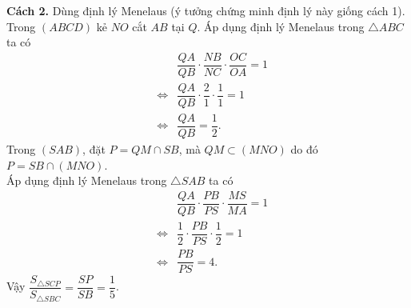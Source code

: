 \begin{bt}
{\begin{enumerate}
	\textbf{Cách 2.} Dùng định lý Menelaus (ý tưởng chứng minh định lý này giống cách 1).\\
	Trong $ (ABCD) $ kẻ $ NO $ cắt $ AB $	tại $ Q $. Áp dụng định lý Menelaus trong $ \triangle ABC $ ta có
	\begin{eqnarray*}
		& & \dfrac{QA}{QB} \cdot \dfrac{NB}{NC} \cdot \dfrac{OC}{OA} = 1 \\
		& \Leftrightarrow & \dfrac{QA}{QB} \cdot \dfrac{2}{1} \cdot \dfrac{1}{1} = 1 \\
		& \Leftrightarrow & \dfrac{QA}{QB} = \dfrac{1}{2}.
	\end{eqnarray*}
	Trong $ (SAB) $, đặt $ P = QM \cap SB $, mà $ QM \subset (MNO) $ do đó $ P = SB \cap (MNO) $. \\
	Áp dụng định lý Menelaus trong $ \triangle SAB $ ta có
	\begin{eqnarray*}
		& & \dfrac{QA}{QB} \cdot \dfrac{PB}{PS} \cdot \dfrac{MS}{MA} = 1 \\
		& \Leftrightarrow & \dfrac{1}{2} \cdot \dfrac{PB}{PS} \cdot \dfrac{1}{2} = 1 \\
		& \Leftrightarrow & \dfrac{PB}{PS} = 4.
	\end{eqnarray*}
	Vậy	 $ \dfrac{S_{\triangle SCP}}{S_{\triangle SBC}} = \dfrac{SP}{SB} = \dfrac{1}{5} $.
\end{enumerate}
}\end{bt}

